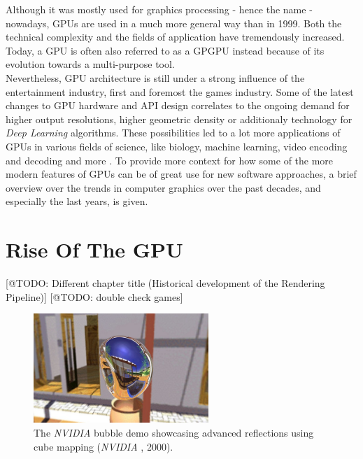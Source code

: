 \noindent
Although it was mostly used for graphics processing - hence the name - nowadays, \ac{GPU}s are used 
in a much more general way than in 1999. Both the technical complexity and the fields of application 
have tremendously increased. Today, a \ac{GPU} is often also referred to as a \ac{GPGPU} instead 
because of its evolution towards a multi-purpose tool. \\

\noindent
Nevertheless, \ac{GPU} architecture is still under a strong influence of the entertainment 
industry, first and foremost the games industry. Some of the latest changes to \ac{GPU} 
hardware and \ac{API} design correlates to the ongoing demand for higher output resolutions, 
higher geometric density or additionaly technology for \emph{Deep Learning} algorithms. 
These possibilities led to a lot more applications of \ac{GPU}s in various fields of science, 
like biology, machine learning, video encoding and decoding and more \cite{Battaglia2024}.
To provide more context for how some of the more modern features of \ac{GPU}s can be of great 
use for new software approaches, a brief overview over the trends in computer graphics over 
the past decades, and especially the last years, is given.


\section{Rise Of The GPU} \label{sec-rise-of-the-gpu}
[@TODO: Different chapter title (Historical development of the Rendering Pipeline)]
[@TODO: double check games]

\begin{figure}[h]
    \centering
    \includegraphics[width=250px]{images/graphics/bubble-reflection-effects-demo.jpg}
    \caption{The \emph{NVIDIA} bubble demo showcasing advanced reflections using cube mapping (\emph{NVIDIA} \cite{NVIDIABubble}, 2000).}
    \label{fig:bubble-reflection-demo}
\end{figure}


